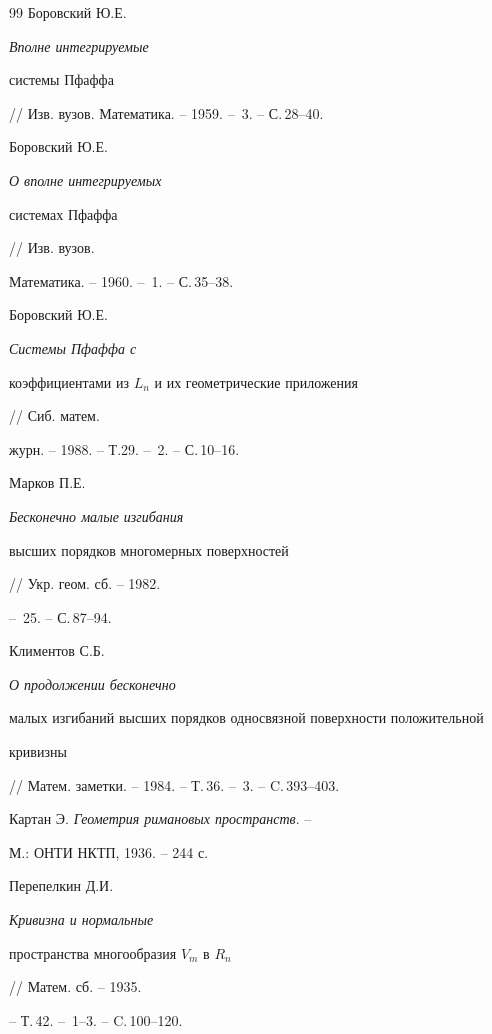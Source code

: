\begin{thebibliography}{99}
 Боровский Ю.Е. {\em Вполне  интегрируемые


системы Пфаффа} // Изв. вузов. Математика. -- 1959. -- \No\,3. -- С.\,28--40.





 Боровский Ю.Е. {\em О вполне интегрируемых


системах Пфаффа} // Изв. вузов.


Математика. -- 1960. -- \No\,1. -- С.\,35--38.





 Боровский  Ю.Е.  {\em Системы  Пфаффа  с


коэффициентами из $L_n$ и их геометрические приложения} // Сиб. матем.


журн. -- 1988. -- Т.29. -- \No\,2. -- С.\,10--16.





 Марков П.Е. {\em Бесконечно малые изгибания


высших порядков многомерных поверхностей} // Укр. геом. сб. -- 1982.


-- \No\,25. -- С.\,87--94.





 Климентов С.Б. {\em О продолжении бесконечно


малых изгибаний высших порядков односвязной поверхности положительной


кривизны} // Матем. заметки. -- 1984. -- Т.\,36. -- \No\,3. -- C.\,393--403.





 Картан Э. {\em Геометрия римановых пространств}. --


М.: ОНТИ НКТП, 1936. -- 244 с.





 Перепелкин Д.И. {\em Кривизна и нормальные


пространства многообразия $V_m$ в $R_n$} // Матем. сб. -- 1935.


-- Т.\,42. -- \No\,1--3. -- C.\,100--120.





\end{thebibliography} 


 


\vskip 2cm 


 






 


 


